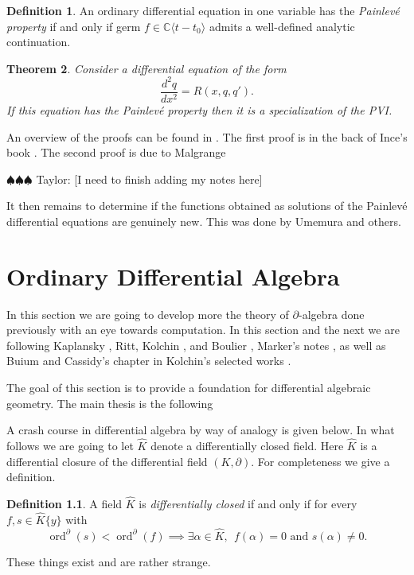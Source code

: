 \documentclass[12pt]{book}
\newcommand{\taylor}[1]{{\color{blue} \sf $\spadesuit\spadesuit\spadesuit$ Taylor: [#1]}}
\numberwithin{equation}{section}
\newtheorem{theorem}{Theorem}[subsection]
\theoremstyle{definition}
\newtheorem{definition}[theorem]{Definition}
\theoremstyle{remark}
\newcommand{\CC}{\mathbb{C}}
\newcommand{\ord}{\operatorname{ord}}
\newcommand{\Khat}{\widehat{K}}
\begin{document}
\begin{definition}
	An ordinary differential equation in one variable has the \emph{Painlev\'e property} if and only if germ $f\in\CC\langle t-t_0\rangle$ admits a well-defined analytic continuation.
\end{definition}

\begin{theorem}
	Consider a differential equation of the form 
	$$ \dfrac{d^2q}{dx^2} = R(x,q,q'). $$
	If this equation has the Painlev\'{e} property then it is a specialization of the PVI.
\end{theorem}

An overview of the proofs can be found in \cite{Shimomura2003}.
The first proof is in the back of Ince's book \cite{Ince1944}. 
The second proof is due to Malgrange 

\taylor{I need to finish adding my notes here}


It then remains to determine if the functions obtained as solutions of the Painlev\'e differential equations are genuinely new. 
This was done by Umemura and others. 


\chapter{Ordinary Differential Algebra}

In this section we are going to develop more the theory of $\partial$-algebra done previously with an eye towards computation. 
In this section and the next we are following Kaplansky \cite{Kaplansky1976}, Ritt\cite{Ritt1950}, Kolchin \cite{Kolchin1973}, and Boulier \cite[\href{https://hal.archives-ouvertes.fr/hal-02378197v2/document}{online version}]{Boulier2019}, Marker's notes \cite{Marker2000}, as well as Buium and Cassidy's chapter in Kolchin's selected works \cite{Kolchin1999}.

The goal of this section is to provide a foundation for differential algebraic geometry. 
The main thesis is the following

A crash course in differential algebra by way of analogy is given below. 
In what follows we are going to let $\Khat$ denote a differentially closed field. 
Here $\widehat{K}$ is a differential closure of the differential field $(K,\partial)$. 
For completeness we give a definition.
\begin{definition}
	A field $\widehat{K}$ is \emph{differentially closed} if and only if for every $f,s\in \Khat\lbrace y\rbrace$ with 
	$$\ord^{\partial}(s)<\ord^{\partial}(f) \implies \exists \alpha \in \Khat, \ \ f(\alpha)=0 \mbox{ and } s(\alpha)\neq 0. $$
\end{definition}
These things exist and are rather strange.
\end{document}
